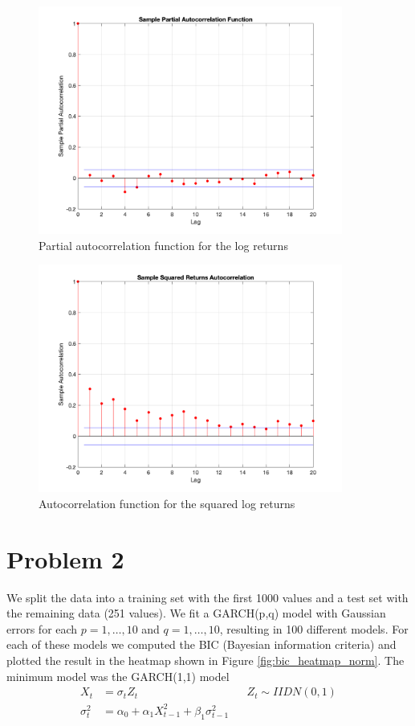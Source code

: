 \documentclass{article}
\begin{document}
\begin{figure}[H]
\includegraphics[width=10cm]{plots/pacf_log_rtns.png}
\centering
\caption{Partial autocorrelation function for the log returns}
\label{fig:pacf_log_rtns}
\end{figure}

\begin{figure}[H]
\includegraphics[width=10cm]{plots/acf_square_rtns.png}
\centering
\caption{Autocorrelation function for the squared log returns}
\label{fig:acf_square_rtns}
\end{figure}

\section*{Problem 2}

We split the data into a training set with the first 1000 values and a test set with the remaining data (251 values).
We fit a GARCH(p,q) model with Gaussian errors for each $p = 1, \ldots, 10$ and $q = 1, \ldots, 10$, resulting in 100 different models.
For each of these models we computed the BIC (Bayesian information criteria) and plotted the result in the heatmap shown in Figure \ref{fig:bic_heatmap_norm}.
The minimum model was the GARCH(1,1) model
\begin{align*}
X_t &= \sigma_t Z_t && Z_t \sim IIDN(0, 1)\\
\sigma_t^2 &= \alpha_0 + \alpha_1 X_{t - 1}^2 + \beta_1 \sigma_{t - 1}^2
\end{align*}
\end{document}
